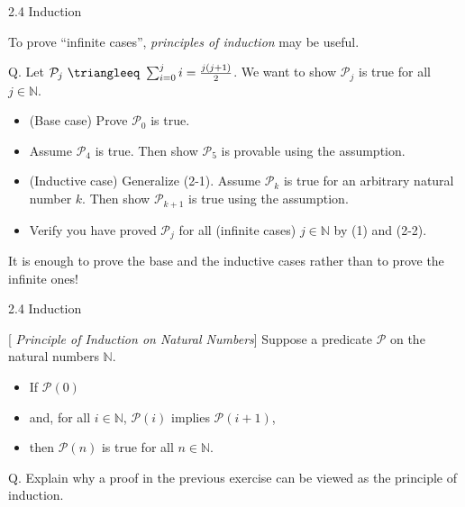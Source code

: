 \documentclass[table]{beamer}
\begin{document}
\begin{frame}[t]{2.4 Induction} 

To prove ``infinite cases'', {\it principles of induction} may be useful.

\vspace{10pt}

Q. Let $\mathcal{P}_j\ \triangleeq \ \sum_{i=0}^j i = \frac{j(j+1)}{2}$.  
	We want to show $\mathcal{P}_j$ is true for all $j\in\mathbb{N}$.
\begin{itemize}
\item[1] (Base case) Prove $\mathcal{P}_0$ is true.
\item[2-1] Assume $\mathcal{P}_4$ is true. Then show $\mathcal{P}_5$ is provable using the assumption.
\item[2-2] (Inductive case) Generalize (2-1). Assume $\mathcal{P}_k$ is true for an arbitrary natural number $k$. Then show $\mathcal{P}_{k+1}$ is true using the assumption.
\item[3] Verify you have proved $\mathcal{P}_j$ for all (infinite cases) $j\in\mathbb{N}$ by (1) and (2-2). 
\end{itemize}

\vspace{10pt}

It is enough to prove the base and the inductive cases rather than to prove the infinite ones!

\end{frame}

\begin{frame}[t]{2.4 Induction} \vspace{10pt}

[{\it \color{red} Principle of Induction on Natural Numbers}]
Suppose a predicate $\mathcal{P}$ on the natural numbers $\mathbb{N}$. 
\begin{itemize}
\item[] If $\mathcal{P}(0)$
\item[] and, for all $i\in \mathbb{N}$, $\mathcal{P}(i)$ implies $\mathcal{P}(i+1)$,
\item[] then $\mathcal{P}(n)$ is true for all $n \in \mathbb{N}$.
\end{itemize}

\vspace{10pt}

Q. Explain why a proof in the previous exercise can be viewed as the principle of induction.

\end{frame}
\end{document}
